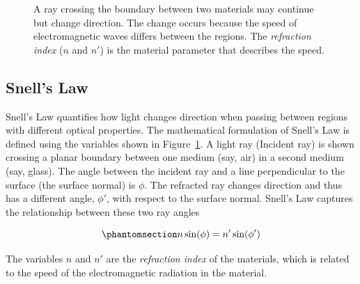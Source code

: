 \documentclass[
  letterpaper,
]{book}
\begin{document}
\begin{figure}


\caption{\label{fig-snell-law}A ray crossing the boundary between two
materials may continue but change direction. The change occurs because
the speed of electromagnetic waves differs between the regions. The
\emph{refraction index} (\(n\) and \(n'\)) is the material parameter
that describes the speed.}

\end{figure}%

\subsection{Snell's Law}\label{snells-law}

Snell's Law quantifies how light changes direction when passing between
regions with different optical properties. The mathematical formulation
of Snell's Law is defined using the variables shown in
Figure~\ref{fig-snell-law}. A light ray (Incident ray) is shown crossing
a planar boundary between one medium (say, air) in a second medium (say,
glass). The angle between the incident ray and a line perpendicular to
the surface (the surface normal) is \(\phi\). The refracted ray changes
direction and thus has a different angle, \(\phi '\), with respect to
the surface normal. Snell's Law captures the relationship between these
two ray angles

\begin{equation}\phantomsection\label{eq-snell}{ 
n \sin(\phi) = n' \sin(\phi') 
}\end{equation}

The variables \(n\) and \(n'\) are the \emph{refraction index} of the
materials, which is related to the speed of the electromagnetic
radiation in the material.
\end{document}

